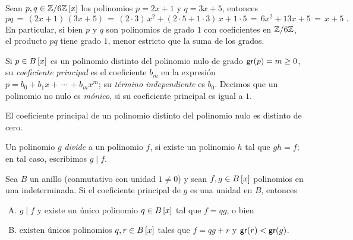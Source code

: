 \begin{ejemPolinomios}\label{ejem:polinomios:grado}
	Sean $p,q\in\polinomios{\Enterosmod[6]} x$ los polinomios
	$p=2x+1$ y $q=3x+5$, entonces
	\begin{displaymath}
		pq\,=\,(2x+1)\,(3x+5)\,=\,(2\cdot 3)\,x^2+
			(2\cdot 5+1\cdot 3)\,x+1\cdot 5\,=\,
			6 x^2+13 x+5\,=\,x+5
		\text{ .}
	\end{displaymath}
	En particular, si bien $p$ y $q$ son polinomios de grado $1$ con
	coeficientes en $\Enterosmod[6]$, el producto $pq$ tiene grado
	$1$, menor estricto que la suma de los grados.
\end{ejemPolinomios}

\begin{defPolinomios}\label{def:polinomios:coeficientes}
	Si $p\in\polinomios B x$ es un polinomio distinto del polinomio
	nulo de grado $\grado(p)=m\geq 0$, su \emph{coeficiente principal}
	es el coeficiente $b_m$ en la expresi\'on
	$p=b_0+b_1x+\,\cdots\,+b_mx^m$; su \emph{t\'ermino independiente}
	es $b_0$. Decimos que un polinomio no nulo es \emph{m\'onico},
	si su coeficiente principal es igual a $1$.
\end{defPolinomios}

\begin{obsPolinomios}\label{obs:polinomios:coeficientes}
	El coeficiente principal de un polinomio distinto del polinomio
	nulo es distinto de cero.
\end{obsPolinomios}

\begin{defPolinomios}\label{def:polinomios:divisibilidad}
	Un polinomio $g$ \emph{divide} a un polinomio $f$, si existe un
	polinomio $h$ tal que $gh=f$; en tal caso, escribimos $g\mid f$.
\end{defPolinomios}

\begin{teoPolinomios}\label{teo:polinomios:algoritmo}
	Sea $B$ un anillo (conmutativo con unidad $1\neq 0$) y sean
	$f,g\in\polinomios B x$ polinomios en una indeterminada.
	Si el coeficiente principal de $g$ es una unidad en $B$, entonces
	\begin{enumerate}[(A)]
		\item\label{item:teo:polinomios:algoritmo:1}
			$g\mid f$ y existe un \'unico polinomio
			$q\in\polinomios B x$ tal que $f=qg$, o bien
		\item\label{item:teo:polinomios:algoritmo:2}
			existen \'unicos polinomios $q,r\in\polinomios B x$
			tales que $f=qg+r$ y $\grado(r)<\grado(g)$.
	\end{enumerate}
\end{teoPolinomios}

